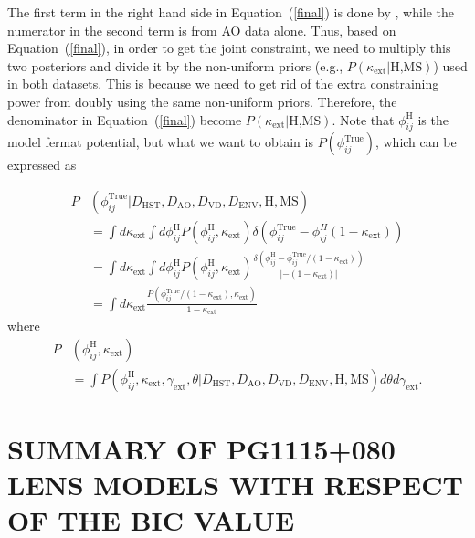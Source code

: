 \documentclass[useAMS,usenatbib]{mnras}
\newcommand{\eref}[1]{Equation~(\ref{#1})}
\begin{document}
The first term in the right hand side in \eref{final} is done by \citet{WongEtal17}, while the numerator in the second term is from AO data alone. Thus, based on \eref{final}, in order to get the joint constraint, we need to multiply this two posteriors and divide it by the non-uniform priors (e.g., $P(\kappa_{\textrm{ext}}|\textrm{H,MS})$) used in both datasets. This is because we need to get rid of the extra constraining power from doubly using the same non-uniform priors.
Therefore, the denominator in \eref{final} become $P(\kappa_{\textrm{ext}}|\textrm{H,MS})$.
Note that $\phi_{ij}^{\textrm{H}}$ is the model fermat potential, but what we want to obtain is $P(\phi_{ij}^{\textrm{True}})$, which can be expressed as

\begin{equation}
\begin{split}
P&(\phi_{ij}^{\textrm{True}}|D_{\textrm{HST}},D_{\textrm{AO}},D_{\textrm{VD}}, D_{\textrm{ENV}},\textrm{H},\textrm{MS})\\
    &=\int d\kappa_{\textrm{ext}}\int d\phi^{\textrm{H}}_{ij}P(\phi^{\textrm{H}}_{ij},\kappa_{\textrm{ext}})\delta(\phi^{\textrm{True}}_{ij}-\phi^{H}_{ij}(1-\kappa_{\textrm{ext}}))\\
    &=\int d\kappa_{\textrm{ext}}\int d\phi^{\textrm{H}}_{ij}P(\phi^{\textrm{H}}_{ij},\kappa_{\textrm{ext}})\frac{\delta(\phi^{\textrm{H}}_{ij}-\phi^{\textrm{True}}_{ij}/(1-\kappa_{\textrm{ext}}))}{|-(1-\kappa_{\textrm{ext}})|}\\
    &=\int d\kappa_{\textrm{ext}}\frac{P(\phi^{\textrm{True}}_{ij}/(1-\kappa_{\textrm{ext}}),\kappa_{\textrm{ext}})}{1-\kappa_{\textrm{ext}}}
\end{split}
\end{equation}
where 
\begin{equation}
\begin{split}
P&(\phi^{\textrm{H}}_{ij},\kappa_{\textrm{ext}})\\
&=\int P(\phi_{ij}^{\textrm{H}},\kappa_{\textrm{ext}},\gamma_{\textrm{ext}},\theta|D_{\textrm{HST}},D_{\textrm{AO}},D_{\textrm{VD}}, D_{\textrm{ENV}},\textrm{H},\textrm{MS}) d\theta d\gamma_{\textrm{ext}}.
\end{split}
\end{equation}
\section{SUMMARY OF PG1115+080 LENS MODELS WITH RESPECT OF THE BIC VALUE}
\label{appendix:pg_BIC}
\end{document}
